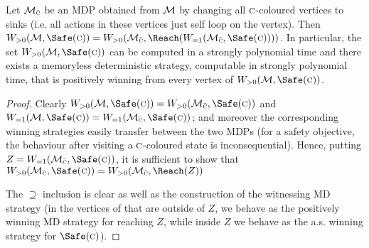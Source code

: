 \begin{theorem}
\label{5-thm:pos-safety-main}
Let $ \mathcal{M}_{\bar{\textsc{c}}} $ be an MDP obtained from $ \mathcal{M} $ by changing all $ \textsc{c} $-coloured vertices to sinks (i.e. all actions in these vertices just self loop on the vertex). Then
$ \winPos(\mdp,\Safe(\genColour)) = \winPos(\mdp_{\bar\genColour},\Reach(\winAS(\mdp_{\bar\genColour},\Safe(\genColour))) ) $. In particular, the set $ \winPos(\mdp,\Safe(\genColour)) $ can be computed in a strongly polynomial time and there exists a memoryless deterministic strategy, computable in strongly polynomial time, that is positively winning from every vertex of $\winPos(\mdp,\Safe(\genColour))$.
\end{theorem}
\begin{proof}
Clearly $ \winPos(\mdp,\Safe(\genColour)) = \winPos(\mdp_{\bar{\genColour}},\Safe(\genColour)) $ and $ \winAS(\mdp,\Safe(\genColour)) = \winAS(\mdp_{\bar{\genColour}},\Safe(\genColour)) $; and moreover the corresponding winning strategies easily transfer between the two MDPs (for a safety objective, the behaviour after visiting a $ \textsc{c} $-coloured state is inconsequential).
Hence, putting $ Z = \winAS(\mdp_{\bar{\genColour}},\Safe(\genColour)) $, it is sufficient to show that  $ \winPos(\mdp_{\bar{\genColour}},\Safe(\genColour)) =\winPos(\mdp_{\bar\genColour},\Reach(Z))  $  

The $ \supseteq $  inclusion is clear as well as the construction of the witnessing MD strategy (in the vertices of that are outside of $ Z $, we behave as the positively winning MD strategy for reaching $ Z $, while inside $ Z $ we behave as the a.s. winning strategy for $ \Safe(\genColour) $). 


\end{proof}
